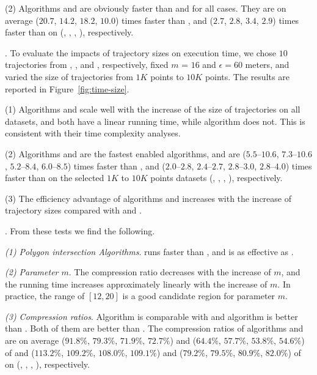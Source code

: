 \ni(2) Algorithms \cist and \cista are obviously faster than \dps and \squishe for all cases.
They are on average ($20.7$, $14.2$, $18.2$, $10.0$) times faster than \dps, and ($2.7$, $2.8$, $3.4$, {$2.9$}) times faster than \squishe on (\truck, \sercar, {\geolife}, \pricar), respectively.


.
To evaluate the impacts of trajectory sizes on execution time,
we chose {$10$} trajectories from \truck, \sercar, \geolife and \pricar, respectively,
fixed $m$ = $16$ and $\epsilon = 60$ meters, and varied the size  of trajectories from $1K$ points to $10K$ points.
%
The results are reported in Figure~\ref{fig:time-size}.

\ni(1) Algorithms \cist and \cista scale well with the increase of the size of trajectories on all datasets,
and both have a linear running time, while algorithm \dps does not.
This is consistent with their time complexity analyses.

\ni(2) Algorithms \cist and \cista are the fastest \sed enabled \lsa algorithms, and are {($5.5$--$10.6$, $7.3$--$10.6$, $5.2$--$8.4$, $6.0$--$8.5$)} times faster than \dps,
and {($2.0$--$2.8$, $2.4$--$2.7$, $2.8$--$3.0$, $2.8$--$4.0$)} times faster than \squishe on the selected $1K$ to $10K$ points datasets (\truck, \sercar, \geolife, \pricar), respectively.

\ni(3) The efficiency advantage of algorithms \cist and \cista increases with the increase of trajectory sizes compared with \dps and \squishe.



.
From these tests we find the following.

\sstab \emph{(1) Polygon intersection Algorithms}. \rpia runs faster than \cpia, and is as effective as \cpia.

\sstab\emph{(2) Parameter $m$}. The compression ratio decreases with the increase of $m$, and the running time increases approximately linearly with the increase of $m$. In practice, the range of $[12, 20]$ is a good candidate region for parameter $m$.

\sstab\emph{(3) Compression ratios}. Algorithm \cist is comparable with \dps and algorithm \cista is better than \dps.
Both of them are better than \squishe.
The compression ratios of algorithms \cist and \cista are on average ($91.8\%$, $79.3\%$, $71.9\%$, {$72.7\%$}) and ($64.4\%$, $57.7\%$, $53.8\%$, {$54.6\%$}) of \squishe and ($113.2\%$, $109.2\%$, $108.0\%$, $109.1\%$) and ($79.2\%$, $79.5\%$, $80.9\%$, $82.0\%$) of \dps on (\truck, \sercar, \geolife, \pricar), respectively.


